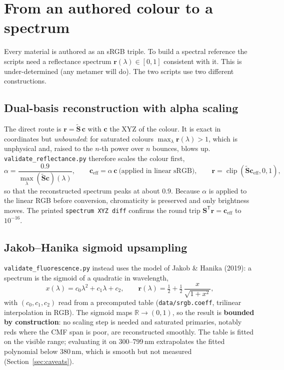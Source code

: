 \documentclass[11pt,a4paper]{article}
\newcommand{\mS}{\mathbf{S}}
\newcommand{\mSd}{\tilde{\mathbf{S}}}
\newcommand{\vr}{\mathbf{r}}
\newcommand{\vc}{\mathbf{c}}
\newcommand{\transp}{^{\mathsf{T}}}
\newcommand{\file}[1]{\texttt{#1}}
\newcommand{\code}[1]{\texttt{#1}}
\begin{document}
\section{From an authored colour to a spectrum}
\label{sec:upsampling}

Every material is authored as an sRGB triple.  To build a spectral reference the
scripts need a reflectance spectrum $\vr(\lambda)\in[0,1]$ consistent with it.
This is under-determined (any metamer will do).  The two scripts use two
different constructions.

\subsection{Dual-basis reconstruction with alpha scaling}
\label{sec:alpha}

The direct route is $\vr = \mSd\,\vc$ with $\vc$ the XYZ of the colour.  It is
exact in coordinates but \emph{unbounded}: for saturated colours $\max_\lambda
\vr(\lambda) > 1$, which is unphysical and, raised to the $n$-th power over $n$
bounces, blows up.  \file{validate\_reflectance.py} therefore scales the colour
first,
\begin{equation}
  \alpha = \frac{0.9}{\max_\lambda (\mSd\vc)(\lambda)},\qquad
  \vc_{\text{eff}} = \alpha\,\vc \ \text{(applied in linear sRGB)},\qquad
  \vr = \operatorname{clip}(\mSd\vc_{\text{eff}},0,1),
\end{equation}
so that the reconstructed spectrum peaks at about $0.9$.  Because $\alpha$ is
applied to the linear RGB before conversion, chromaticity is preserved and only
brightness moves.  The printed \code{spectrum XYZ diff} confirms the round trip
$\mS\transp\vr = \vc_{\text{eff}}$ to $10^{-16}$.

\subsection{Jakob--Hanika sigmoid upsampling}
\label{sec:jh}

\file{validate\_fluorescence.py} instead uses the model of Jakob \& Hanika
(2019): a spectrum is the sigmoid of a quadratic in wavelength,
\begin{equation}
  x(\lambda) = c_0\lambda^2 + c_1\lambda + c_2, \qquad
  \vr(\lambda) = \tfrac12 + \tfrac12\,\frac{x}{\sqrt{1+x^2}} ,
\end{equation}
with $(c_0,c_1,c_2)$ read from a precomputed table (\file{data/srgb.coeff},
trilinear interpolation in RGB).  The sigmoid maps $\mathbb{R}\to(0,1)$, so the
result is \textbf{bounded by construction}: no scaling step is needed and
saturated primaries, notably reds where the CMF span is poor, are reconstructed
smoothly.  The table is fitted on the visible range; evaluating it on
300--799\,nm extrapolates the fitted polynomial below 380\,nm, which is smooth
but not measured (Section~\ref{sec:caveats}).
\end{document}
